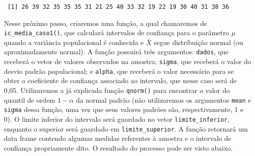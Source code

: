 \documentclass[
  letterpaper,
  DIV=11,
  numbers=noendperiod]{scrreprt}
\begin{document}
\begin{verbatim}
 [1] 26 39 32 35 35 35 31 21 25 40 33 32 19 22 19 30 40 31 38 36
\end{verbatim}

Nesse próximo passo, criaremos uma função, a qual chamaremos de
\texttt{ic\_media\_caso1()}, que calculará intervalos de confiança para
o parâmetro \(\mu\) quando a variância populacional é conhecida e
\(\bar{X}\) segue distribuição normal (ou aproximadamente normal). A
função possuirá três argumentos: \texttt{dados}, que receberá o vetor de
valores observados na amostra; \texttt{sigma}, que receberá o valor do
desvio padrão populacional; e \texttt{alpha}, que receberá o valor
necessário para se obter o coeficiente de confiança associado ao
intervalo, que nesse caso será de 0,05. Utilizaremos a já explicada
função \texttt{qnorm()} para encontrar o valor do quantil de ordem
\(1 - \alpha\) da normal padrão (não utilizaremos os argumentos
\texttt{mean} e \texttt{sigma} dessa função, uma vez que seus valores
padrões são, respectivamente, 1 e 0). O limite inferior do intervalo
será guardado no vetor \texttt{limite\_inferior}, enquanto o superior
será guardado em \texttt{limite\_superior}. A função retornará um data
frame contendo algumas medidas referentes à amostra e o intervalo de
confiança propriamente dito. O resultado do processo pode ser visto
abaixo.
\end{document}
